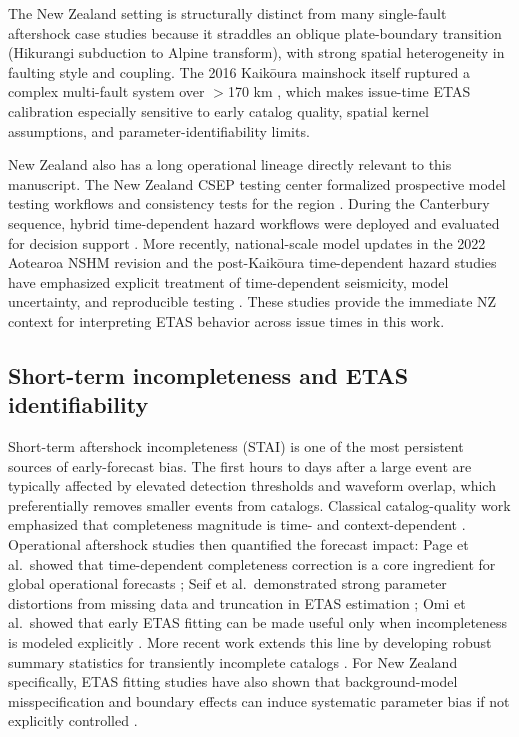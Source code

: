 \documentclass[12pt,letterpaper]{article}
\begin{document}
The New Zealand setting is structurally distinct from many single-fault
aftershock case studies because it straddles an oblique plate-boundary
transition (Hikurangi subduction to Alpine transform), with strong spatial
heterogeneity in faulting style and coupling. The 2016 Kaik\={o}ura mainshock
itself ruptured a complex multi-fault system over $>$170 km
\cite{hamling2017kaikoura}, which makes issue-time ETAS calibration especially
sensitive to early catalog quality, spatial kernel assumptions, and
parameter-identifiability limits.

New Zealand also has a long operational lineage directly relevant to this
manuscript. The New Zealand CSEP testing center formalized prospective model
testing workflows and consistency tests for the region
\cite{gerstenberger2010nztest}. During the Canterbury sequence, hybrid
time-dependent hazard workflows were deployed and evaluated for decision support
\cite{gerstenberger2016canterbury}. More recently, national-scale model updates
in the 2022 Aotearoa NSHM revision and the post-Kaik\={o}ura
time-dependent hazard studies have emphasized explicit treatment of
time-dependent seismicity, model uncertainty, and reproducible testing
\cite{gerstenberger2024nshm,gerstenberger2024srm,gerstenberger2023kaikourahaz}.
These studies provide the immediate NZ context for interpreting ETAS behavior
across issue times in this work.

\subsection{Short-term incompleteness and ETAS identifiability}

Short-term aftershock incompleteness (STAI) is one of the most persistent
sources of early-forecast bias. The first hours to days after a large event are
typically affected by elevated detection thresholds and waveform overlap, which
preferentially removes smaller events from catalogs. Classical catalog-quality
work emphasized that completeness magnitude is time- and context-dependent
\cite{woessner2005}. Operational aftershock studies then quantified the forecast
impact: Page et al.\ showed that time-dependent completeness correction is a
core ingredient for global operational forecasts \cite{page2016}; Seif et al.\
demonstrated strong parameter distortions from missing data and truncation in
ETAS estimation \cite{seif2017}; Omi et al.\ showed that early ETAS fitting can
be made useful only when incompleteness is modeled explicitly
\cite{omi2013,omi2014,omi2015}. More recent work extends this line by developing
robust summary statistics for transiently incomplete catalogs
\cite{vandere1st2021,hainzl2024}.
For New Zealand specifically, ETAS fitting studies have also shown that
background-model misspecification and boundary effects can induce systematic
parameter bias if not explicitly controlled \cite{harte2013bias}.
\end{document}

